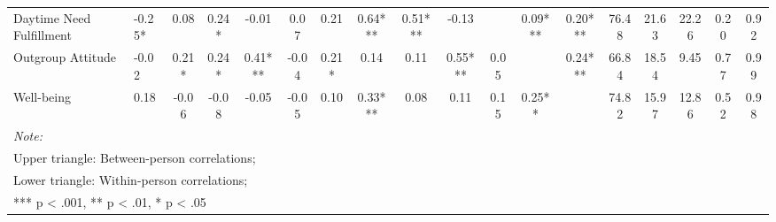 \begin{sidewaystable}
{\begin{tabular}[t]{llcccccccccccccccc}
Daytime Need Fulfillment & -0.25* & 0.08 & 0.24* & -0.01 & 0.07 & 0.21 & 0.64*** & 0.51*** & -0.13 &  & 0.09*** & 0.20*** & 76.48 & 21.63 & 22.26 & 0.20 & 0.92\\
\addlinespace
Outgroup Attitude & -0.02 & 0.21* & 0.24* & 0.41*** & -0.04 & 0.21* & 0.14 & 0.11 & 0.55*** & 0.05 &  & 0.24*** & 66.84 & 18.54 & 9.45 & 0.77 & 0.99\\
Well-being & 0.18 & -0.06 & -0.08 & -0.05 & -0.05 & 0.10 & 0.33*** & 0.08 & 0.11 & 0.15 & 0.25** &  & 74.82 & 15.97 & 12.86 & 0.52 & 0.98\\
\bottomrule
\multicolumn{18}{l}{\rule{0pt}{1em}\textit{Note: }}\\
\multicolumn{18}{l}{\rule{0pt}{1em}Upper triangle: Between-person correlations;}\\
\multicolumn{18}{l}{\rule{0pt}{1em}Lower triangle: Within-person correlations;}\\
\multicolumn{18}{l}{\rule{0pt}{1em}*** p < .001, ** p < .01,  * p < .05}\\
\end{tabular}}
\end{sidewaystable}
